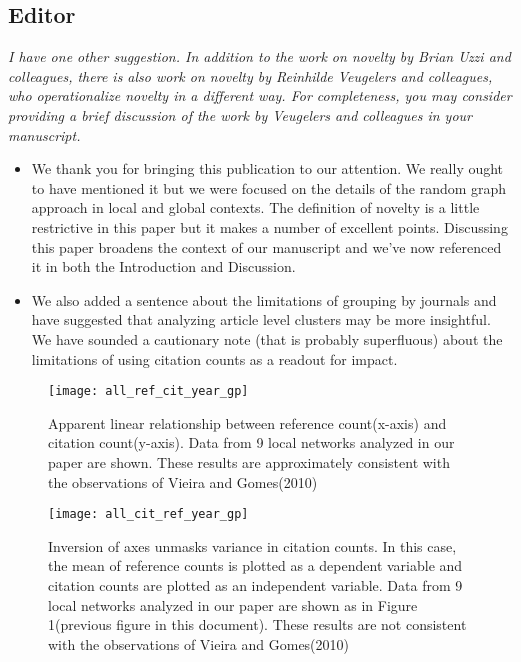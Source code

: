 \documentclass[11pt, oneside]{article}   	%
\begin{document}
\subsection{Editor}
\emph{I have one other suggestion. In addition to the work on novelty by Brian Uzzi and colleagues, there is also work on novelty by Reinhilde Veugelers and colleagues, who operationalize novelty in a different way. For completeness, you may consider providing a brief discussion of the work by Veugelers and colleagues in your manuscript.}
\begin{itemize}
\item We thank you for bringing this publication to our attention. We really ought to have mentioned it but we were focused on the details of the random graph approach in local and global contexts. The definition of novelty is a little restrictive in this paper but it makes a number of excellent points. Discussing this paper broadens the context of our manuscript and we've now referenced it in both the Introduction and Discussion. 
\item We also added a sentence about the limitations of grouping by journals and have suggested that analyzing article level clusters may be more insightful. We have sounded a cautionary note (that is probably superfluous) about the limitations of using citation counts as a readout for impact. \end{itemize}
 
 \newpage

\begin{figure}[tbhp]
\centering
\texttt{[image: all\_ref\_cit\_year\_gp]}     
\caption{Apparent linear relationship between reference count(x-axis) and citation count(y-axis). Data from 9 local networks analyzed in our paper are shown. These results are approximately consistent with the observations of Vieira and Gomes(2010)} 
\label{fig:refcit}
\end{figure}
\newpage

\begin{figure}[tbhp]
\centering
\texttt{[image: all\_cit\_ref\_year\_gp]}     
\caption{Inversion of axes unmasks variance in citation counts. In this case, the mean of reference counts is plotted as a dependent variable and citation counts are plotted as an independent variable. Data from 9 local networks analyzed in our paper are shown as in Figure 1(previous figure in this document). These results are not consistent with the observations  of Vieira and Gomes(2010)} 
\label{fig:citref}
\end{figure}
\newpage
\end{document}
